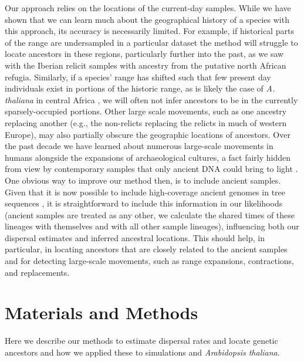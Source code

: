 \documentclass[12pt]{article}
\begin{document}
Our approach relies on the locations of the current-day samples. 
While we have shown that we can learn much about the geographical history of a species with this approach, its accuracy is necessarily limited. 
For example, if historical parts of the range are undersampled in a particular dataset the method will struggle to locate ancestors in these regions, particularly further into the past, as we saw with the Iberian relicit samples with ancestry from the putative north African refugia.
Similarly, if a species' range has shifted such that few present day individuals exist in portions of the historic range, as is likely the case of \textit{A. thaliana} in central Africa \citep{fulgione2018archaic}, we will often not infer ancestors to be in the currently sparsely-occupied portions. 
Other large scale movements, such as one ancestry replacing another (e.g., the non-relicts replacing the relicts in much of western Europe), may also partially obscure the geographic locations of ancestors. 
Over the past decade we have learned about numerous large-scale movements in humans alongside the expansions of archaeological cultures, a fact fairly hidden from view by contemporary samples that only ancient DNA could bring to light \citep{slatkin2016ancient,reich2018we}.
One obvious way to improve our method then, is to include ancient samples. 
Given that it is now possible to include high-coverage ancient genomes in tree sequences \citep{speidel2021inferring,wohns2021unified}, it is straightforward to include this information in our likelihoods (ancient samples are treated as any other, we calculate the shared times of these lineages with themselves and with all other sample lineages), influencing both our dispersal estimates and inferred ancestral locations.
This should help, in particular, in locating ancestors that are closely related to the ancient samples and for detecting large-scale movements, such as range expansions, contractions, and replacements.

\section*{Materials and Methods}
\label{sec:methods}

Here we describe our methods to estimate dispersal rates and locate genetic ancestors and how we applied these to simulations and \textit{Arabidopsis thaliana}.
\end{document}
